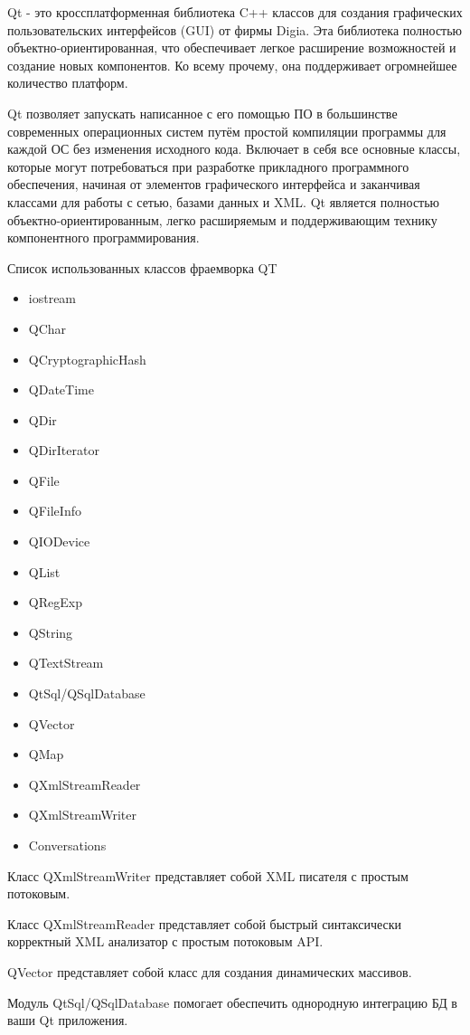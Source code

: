 Qt - это кроссплатформенная библиотека C++ классов для создания графических пользовательских интерфейсов (GUI) от фирмы Digia. Эта библиотека полностью объектно-ориентированная, что обеспечивает легкое расширение возможностей и создание новых компонентов. Ко всему прочему, она поддерживает огромнейшее количество платформ.

Qt позволяет запускать написанное с его помощью ПО в большинстве современных операционных систем путём простой компиляции программы для каждой ОС без изменения исходного кода. Включает в себя все основные классы, которые могут потребоваться при разработке прикладного программного обеспечения, начиная от элементов графического интерфейса и заканчивая классами для работы с сетью, базами данных и XML. Qt является полностью объектно-ориентированным, легко расширяемым и поддерживающим технику компонентного программирования.

Список использованных классов фраемворка QT
\begin{itemize}
\item iostream
\item QChar
\item QCryptographicHash
\item QDateTime
\item QDir
\item QDirIterator
\item QFile
\item QFileInfo
\item QIODevice
\item QList
\item QRegExp
\item QString
\item QTextStream
\item QtSql/QSqlDatabase
\item QVector
\item QMap
\item QXmlStreamReader
\item QXmlStreamWriter
\item Conversations
\end{itemize}

Класс QXmlStreamWriter представляет собой XML писателя с простым потоковым.

Класс QXmlStreamReader представляет собой быстрый синтаксически корректный XML анализатор с простым потоковым API. 

QVector представляет собой класс для создания динамических массивов.

Модуль QtSql/QSqlDatabase помогает обеспечить однородную интеграцию БД в ваши Qt приложения.

